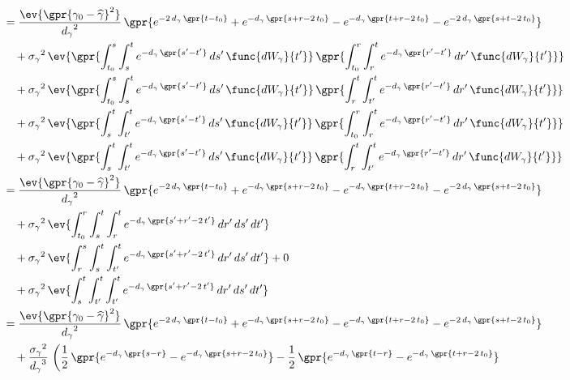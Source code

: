 \begin{align}
    	&= \frac{\ev{\gpr{\gamma_0 - \widehat{\gamma}}^2}}{{d_{\gamma}}^2}\,\gpr{e^{-2\,d_{\gamma}\,\gpr{t - t_0}} + e^{-d_{\gamma}\,\gpr{s + r - 2\,t_0}} - e^{-d_{\gamma}\,\gpr{t + r - 2\,t_0}} - e^{-2\,d_{\gamma}\,\gpr{s + t - 2\,t_0}}}  \nonumber \\
    		&\quad + {\sigma_{\gamma}}^2\,\ev{\gpr{\int_{t_{0}}^{s} \int_{s}^{t} e^{-d_{\gamma}\,\gpr{s' - t'}}\,ds'\,\func{d{W}_{\gamma}}{t'}}\,\gpr{\int_{t_{0}}^{r} \int_{r}^{t} e^{-d_{\gamma}\,\gpr{r' - t'}}\,dr'\,\func{d{W}_{\gamma}}{t'}}} \nonumber \\
    		&\quad + {\sigma_{\gamma}}^2\,\ev{\gpr{\int_{t_{0}}^{s} \int_{s}^{t} e^{-d_{\gamma}\,\gpr{s' - t'}}\,ds'\,\func{d{W}_{\gamma}}{t'}}\,\gpr{\int_{r}^{t} \int_{t'}^{t} e^{-d_{\gamma}\,\gpr{r' - t'}}\,dr'\,\func{d{W}_{\gamma}}{t'}}} \nonumber \\
    		&\quad + {\sigma_{\gamma}}^2\,\ev{\gpr{\int_{s}^{t} \int_{t'}^{t} e^{-d_{\gamma}\,\gpr{s' - t'}}\,ds'\,\func{d{W}_{\gamma}}{t'}}\,\gpr{\int_{t_{0}}^{r} \int_{r}^{t} e^{-d_{\gamma}\,\gpr{r' - t'}}\,dr'\,\func{d{W}_{\gamma}}{t'}}} \nonumber \\
    		&\quad + {\sigma_{\gamma}}^2\,\ev{\gpr{\int_{s}^{t} \int_{t'}^{t} e^{-d_{\gamma}\,\gpr{s' - t'}}\,ds'\,\func{d{W}_{\gamma}}{t'}}\,\gpr{\int_{r}^{t} \int_{t'}^{t} e^{-d_{\gamma}\,\gpr{r' - t'}}\,dr'\,\func{d{W}_{\gamma}}{t'}}} \nonumber \\
    	&= \frac{\ev{\gpr{\gamma_0 - \widehat{\gamma}}^2}}{{d_{\gamma}}^2}\,\gpr{e^{-2\,d_{\gamma}\,\gpr{t - t_0}} + e^{-d_{\gamma}\,\gpr{s + r - 2\,t_0}} - e^{-d_{\gamma}\,\gpr{t + r - 2\,t_0}} - e^{-2\,d_{\gamma}\,\gpr{s + t - 2\,t_0}}}  \nonumber \\
    		&\quad + {\sigma_{\gamma}}^2\,\ev{\int_{t_0}^{r} \int_{s}^{t} \int_{r}^{t} e^{-d_{\gamma}\,\gpr{s' + r' - 2\,t'}}\,dr'\,ds'\,dt'} \nonumber \\
    		&\quad + {\sigma_{\gamma}}^2\,\ev{\int_{r}^{s} \int_{s}^{t} \int_{t'}^{t} e^{-d_{\gamma}\,\gpr{s' + r' - 2\,t'}}\,dr'\,ds'\,dt'} + 0 \nonumber \\
    		&\quad + {\sigma_{\gamma}}^2\,\ev{\int_{s}^{t} \int_{t'}^{t} \int_{t'}^{t} e^{-d_{\gamma}\,\gpr{s' + r' - 2\,t'}}\,dr'\,ds'\,dt'} \nonumber \\
    	&= \frac{\ev{\gpr{\gamma_0 - \widehat{\gamma}}^2}}{{d_{\gamma}}^2}\,\gpr{e^{-2\,d_{\gamma}\,\gpr{t - t_0}} + e^{-d_{\gamma}\,\gpr{s + r - 2\,t_0}} - e^{-d_{\gamma}\,\gpr{t + r - 2\,t_0}} - e^{-2\,d_{\gamma}\,\gpr{s + t - 2\,t_0}}}  \nonumber \\
    		&\quad + \frac{{\sigma_{\gamma}}^2}{{d_{\gamma}}^{3}}\,\left(\frac{1}{2}\,\gpr{e^{-d_{\gamma}\,\gpr{s - r}} - e^{-d_{\gamma}\,\gpr{s + r - 2\,t_0}}} - \frac{1}{2}\,\gpr{e^{-d_{\gamma}\,\gpr{t - r}} - e^{-d_{\gamma}\,\gpr{t + r - 2\,t_0}}} \right.\nonumber \\

\end{align}
